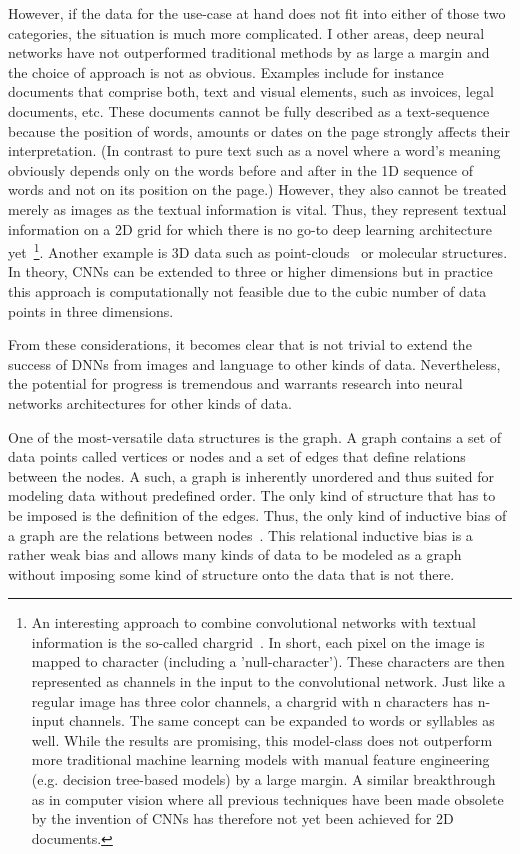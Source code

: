 However, if the data for the use-case at hand does not fit into either of those two categories, the situation is much more complicated. I other areas, deep neural networks have not outperformed traditional methods by as large a margin and the choice of approach is not as obvious. Examples include for instance documents that comprise both, text and visual elements, such as invoices, legal documents, etc. These documents cannot be fully described as a text-sequence because the position of words, amounts or dates on the page strongly affects their interpretation. (In contrast to pure text such as a novel where a word's meaning obviously depends only on the words before and after in the 1D sequence of words and not on its position on the page.) However, they also cannot be treated merely as images as the textual information is vital. Thus, they represent textual information on a 2D grid for which there is no go-to deep learning architecture yet~\footnote{
	An interesting approach to combine convolutional networks with textual information is the so-called chargrid~\cite{Katti2020}. In short, each pixel on the image is mapped to character (including a 'null-character'). These characters are then represented as channels in the input to the convolutional network. Just like a regular image has three color channels, a chargrid with n characters has n-input channels. The same concept can be expanded to words or syllables as well. While the results are promising, this model-class does not outperform more traditional machine learning models with manual feature engineering (e.g. decision tree-based models) by a large margin. A similar breakthrough as in computer vision where all previous techniques have been made obsolete by the invention of CNNs has therefore not yet been achieved for 2D documents.
}. Another example is 3D data such as point-clouds~\cite{Charles2017} or molecular structures. In theory, CNNs can be extended to three or higher dimensions but in practice this approach is computationally not feasible due to the cubic number of data points in three dimensions.

From these considerations, it becomes clear that is not trivial to extend the success of DNNs from images and language to other kinds of data. Nevertheless, the potential for progress is tremendous and warrants research into neural networks architectures for other kinds of data.

One of the most-versatile data structures is the graph. A graph contains a set of data points called vertices or nodes and a set of edges that define relations between the nodes. A such, a graph is inherently unordered and thus suited for modeling data without predefined order. The only kind of structure that has to be imposed is the definition of the edges. Thus, the only kind of inductive bias of a graph are the relations between nodes~\cite{Battaglia2018}. This relational inductive bias is a rather weak bias and allows many kinds of data to be modeled as a graph without imposing some kind of structure onto the data that is not there.


